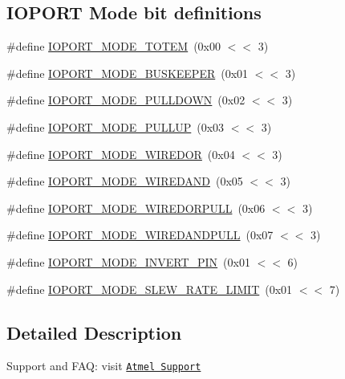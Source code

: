 \subsection*{I\-O\-P\-O\-R\-T Mode bit definitions}
\label{_amgrp174c526c7096d8e7bad7e68f9d853afd}%
 \begin{DoxyCompactItemize}
\item 
\#define \hyperlink{group__ioport__group_ga09bc83ba115ba2da8d9763625421001b}{I\-O\-P\-O\-R\-T\-\_\-\-M\-O\-D\-E\-\_\-\-T\-O\-T\-E\-M}~(0x00 $<$$<$ 3)
\item 
\#define \hyperlink{group__ioport__group_ga877f42c6b744dd9576da832b4772f0ea}{I\-O\-P\-O\-R\-T\-\_\-\-M\-O\-D\-E\-\_\-\-B\-U\-S\-K\-E\-E\-P\-E\-R}~(0x01 $<$$<$ 3)
\item 
\#define \hyperlink{group__ioport__group_ga790f18d21491a223709cec76bc0ecc4d}{I\-O\-P\-O\-R\-T\-\_\-\-M\-O\-D\-E\-\_\-\-P\-U\-L\-L\-D\-O\-W\-N}~(0x02 $<$$<$ 3)
\item 
\#define \hyperlink{group__ioport__group_ga4c5d85e77f012b73dce89cfb84ef851f}{I\-O\-P\-O\-R\-T\-\_\-\-M\-O\-D\-E\-\_\-\-P\-U\-L\-L\-U\-P}~(0x03 $<$$<$ 3)
\item 
\#define \hyperlink{group__ioport__group_gafe254c1a125d7a020b768af3ff5ceaf8}{I\-O\-P\-O\-R\-T\-\_\-\-M\-O\-D\-E\-\_\-\-W\-I\-R\-E\-D\-O\-R}~(0x04 $<$$<$ 3)
\item 
\#define \hyperlink{group__ioport__group_gae0b77dcd28d7e2ec0f0a1967e462ced5}{I\-O\-P\-O\-R\-T\-\_\-\-M\-O\-D\-E\-\_\-\-W\-I\-R\-E\-D\-A\-N\-D}~(0x05 $<$$<$ 3)
\item 
\#define \hyperlink{group__ioport__group_gae5079825b911f58645f7445c9dd7095d}{I\-O\-P\-O\-R\-T\-\_\-\-M\-O\-D\-E\-\_\-\-W\-I\-R\-E\-D\-O\-R\-P\-U\-L\-L}~(0x06 $<$$<$ 3)
\item 
\#define \hyperlink{group__ioport__group_gad3d3d6ac518bb75052c40e4b1bc53d35}{I\-O\-P\-O\-R\-T\-\_\-\-M\-O\-D\-E\-\_\-\-W\-I\-R\-E\-D\-A\-N\-D\-P\-U\-L\-L}~(0x07 $<$$<$ 3)
\item 
\#define \hyperlink{group__ioport__group_gaf3ae92747feac2e40c19bba09b169ac7}{I\-O\-P\-O\-R\-T\-\_\-\-M\-O\-D\-E\-\_\-\-I\-N\-V\-E\-R\-T\-\_\-\-P\-I\-N}~(0x01 $<$$<$ 6)
\item 
\#define \hyperlink{group__ioport__group_ga80394b4c617e7c772d7b5eb16a34952a}{I\-O\-P\-O\-R\-T\-\_\-\-M\-O\-D\-E\-\_\-\-S\-L\-E\-W\-\_\-\-R\-A\-T\-E\-\_\-\-L\-I\-M\-I\-T}~(0x01 $<$$<$ 7)
\end{DoxyCompactItemize}


\subsection{Detailed Description}
Support and F\-A\-Q\-: visit \href{http://www.atmel.com/design-support/}{\tt Atmel Support}


